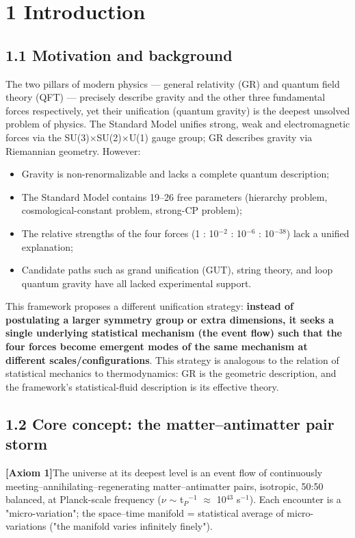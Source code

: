 \documentclass[12pt]{article}
\newcommand{\mtag}[1]{\textbf{[#1]}}
\newcommand{\up}[1]{\ensuremath{^{#1}}}
\newcommand{\down}[1]{\ensuremath{_{#1}}}
\begin{document}
\section{1 Introduction}

\subsection{1.1 Motivation and background}

The two pillars of modern physics --- general relativity (GR) and quantum field theory (QFT) --- precisely describe gravity and the other three fundamental forces respectively, yet their unification (quantum gravity) is the deepest unsolved problem of physics. The Standard Model unifies strong, weak and electromagnetic forces via the SU(3)\ensuremath{\times}SU(2)\ensuremath{\times}U(1) gauge group; GR describes gravity via Riemannian geometry. However:

\begin{itemize}
\item Gravity is non-renormalizable and lacks a complete quantum description;
\item The Standard Model contains 19--26 free parameters (hierarchy problem, cosmological-constant problem, strong-CP problem);
\item The relative strengths of the four forces (1 : 10\up{-2} : 10\up{-6} : 10\up{-38}) lack a unified explanation;
\item Candidate paths such as grand unification (GUT), string theory, and loop quantum gravity have all lacked experimental support.
\end{itemize}

This framework proposes a different unification strategy: \textbf{instead of postulating a larger symmetry group or extra dimensions, it seeks a single underlying statistical mechanism (the event flow) such that the four forces become emergent modes of the same mechanism at different scales/configurations}. This strategy is analogous to the relation of statistical mechanics to thermodynamics: GR is the geometric description, and the framework's statistical-fluid description is its effective theory.

\subsection{1.2 Core concept: the matter--antimatter pair storm}

\mtag{Axiom 1}The universe at its deepest level is an event flow of continuously meeting--annihilating--regenerating matter--antimatter pairs, isotropic, 50:50 balanced, at Planck-scale frequency (\ensuremath{\nu} \ensuremath{\sim} t\down{P}\up{-1} \ensuremath{\approx} 10\up{43} s\up{-1}). Each encounter is a "micro-variation"; the space--time manifold = statistical average of micro-variations ("the manifold varies infinitely finely").
\end{document}
